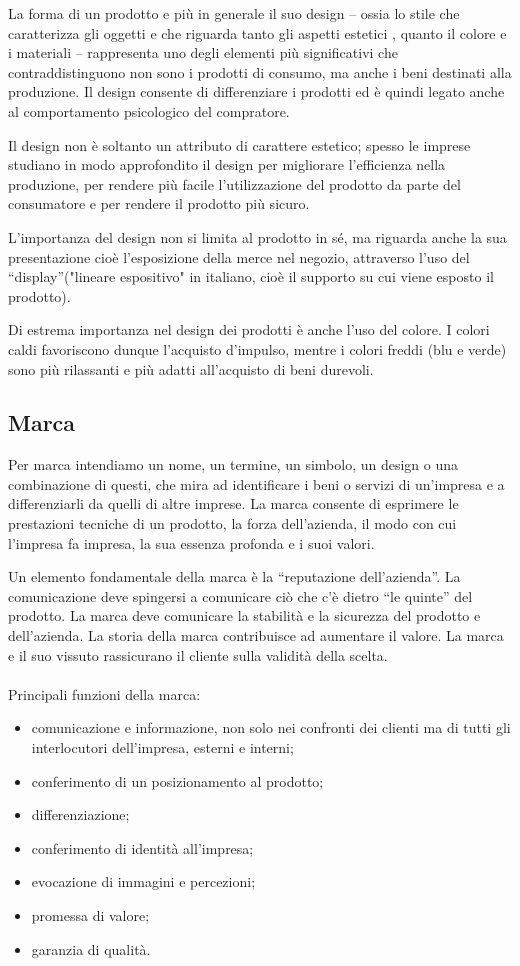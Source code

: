 La forma di un prodotto e più in generale il suo design – ossia lo stile che caratterizza gli oggetti e che riguarda tanto gli aspetti estetici , quanto il colore e i materiali – rappresenta uno
degli elementi più significativi che contraddistinguono non sono i prodotti di consumo, ma anche i beni destinati alla produzione.
Il design consente di differenziare i prodotti ed è quindi legato anche al comportamento psicologico del compratore. 

Il design non è soltanto un attributo di carattere estetico; spesso le imprese studiano in modo approfondito il design per migliorare l’efficienza nella produzione, per rendere più facile l’utilizzazione del prodotto da parte del consumatore e per rendere il prodotto più sicuro.

L’importanza del design non si limita al prodotto in sé, ma riguarda anche la sua presentazione cioè l’esposizione della merce nel negozio, attraverso l’uso del “display”("lineare espositivo"  in italiano, cioè il supporto su cui viene esposto il prodotto).

Di estrema importanza nel design dei prodotti è anche l’uso del colore. I colori caldi favoriscono dunque l’acquisto d’impulso, mentre i colori freddi (blu e verde) sono più rilassanti e più adatti all’acquisto di beni durevoli.

\subsection{Marca}
Per marca intendiamo un nome, un termine, un simbolo, un design o una combinazione di questi, che mira ad identificare i beni o servizi di un’impresa e a differenziarli da quelli di altre imprese.
La marca consente di esprimere le prestazioni tecniche di un prodotto, la forza dell’azienda, il modo con cui l’impresa fa impresa, la sua essenza profonda e i suoi valori.

Un elemento fondamentale della marca è la “reputazione dell’azienda”. La comunicazione deve spingersi a comunicare ciò che c’è dietro “le quinte” del prodotto.
La marca deve comunicare la stabilità e la sicurezza del prodotto e dell’azienda.
La storia della marca contribuisce ad aumentare il valore. La marca e il suo vissuto rassicurano il cliente sulla validità della scelta.
\\
\\
Principali funzioni della marca:
\begin{itemize}
	\item comunicazione e informazione, non solo nei confronti dei clienti ma di tutti gli interlocutori dell’impresa, esterni e interni;
	\item conferimento di un posizionamento al prodotto;
	\item differenziazione;
	\item conferimento di identità all’impresa;
	\item evocazione di immagini e percezioni;
	\item promessa di valore;
	\item garanzia di qualità.
\end{itemize}

